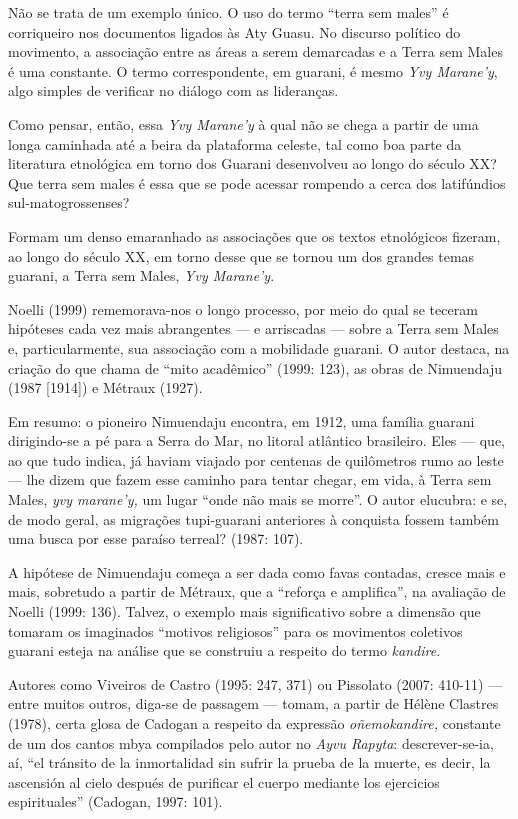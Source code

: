 Não se trata de um exemplo único. O uso do termo ``terra sem males'' é
corriqueiro nos documentos ligados às Aty Guasu. No discurso político do
movimento, a associação entre as áreas a serem demarcadas e a Terra sem
Males é uma constante. O termo correspondente, em guarani, é mesmo
\emph{Yvy Marane'y}, algo simples de verificar no diálogo com as
lideranças.

Como pensar, então, essa \emph{Yvy Marane'y} à qual não se chega a
partir de uma longa caminhada até a beira da plataforma celeste, tal
como boa parte da literatura etnológica em torno dos Guarani desenvolveu
ao longo do século XX? Que terra sem males é essa que se pode acessar
rompendo a cerca dos latifúndios sul-matogrossenses?

Formam um denso emaranhado as associações que os textos etnológicos
fizeram, ao longo do século XX, em torno desse que se tornou um dos
grandes temas guarani, a Terra sem Males, \emph{Yvy Marane'y}.

Noelli (1999) rememorava-nos o longo processo, por meio do qual se
teceram hipóteses cada vez mais abrangentes --- e arriscadas --- sobre a
Terra sem Males e, particularmente, sua associação com a mobilidade
guarani. O autor destaca, na criação do que chama de ``mito acadêmico''
(1999: 123), as obras de Nimuendaju (1987 {[}1914{]}) e Métraux (1927).

Em resumo: o pioneiro Nimuendaju encontra, em 1912, uma família guarani
dirigindo-se a pé para a Serra do Mar, no litoral atlântico brasileiro.
Eles --- que, ao que tudo indica, já haviam viajado por centenas de
quilômetros rumo ao leste --- lhe dizem que fazem esse caminho para
tentar chegar, em vida, à Terra sem Males, \emph{yvy marane'y,} um lugar
``onde não mais se morre''. O autor elucubra: e se, de modo geral, as
migrações tupi-guarani anteriores à conquista fossem também uma busca
por esse paraíso terreal? (1987: 107).

A hipótese de Nimuendaju começa a ser dada como favas contadas, cresce
mais e mais, sobretudo a partir de Métraux, que a ``reforça e
amplifica'', na avaliação de Noelli (1999: 136). Talvez, o exemplo mais
significativo sobre a dimensão que tomaram os imaginados ``motivos
religiosos'' para os movimentos coletivos guarani esteja na análise que
se construiu a respeito do termo \emph{kandire}.

Autores como Viveiros de Castro (1995: 247, 371) ou Pissolato (2007:
410-11) --- entre muitos outros, diga-se de passagem --- tomam, a partir
de Hélène Clastres (1978), certa glosa de Cadogan a respeito da
expressão \emph{oñemokandire,} constante de um dos cantos mbya
compilados pelo autor no \emph{Ayvu Rapyta}: descrever-se-ia, aí, ``el
tránsito de la inmortalidad sin sufrir la prueba de la muerte, es decir,
la ascensión al cielo después de purificar el cuerpo mediante los
ejercicios espirituales'' (Cadogan, 1997: 101).

